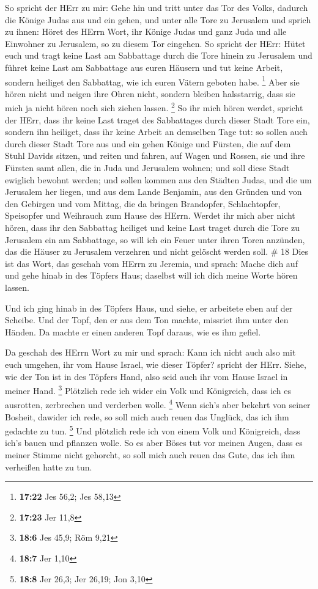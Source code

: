  So spricht der HErr zu mir: Gehe hin und tritt unter das
Tor des Volks, dadurch die Könige Judas aus und ein gehen, und unter
alle Tore zu Jerusalem  und sprich zu ihnen: Höret des
HErrn Wort, ihr Könige Judas und ganz Juda und alle Einwohner zu
Jerusalem, so zu diesem Tor eingehen.  So spricht der HErr:
Hütet euch und tragt keine Last am Sabbattage durch die Tore hinein zu
Jerusalem  und führet keine Last am Sabbattage aus euren
Häusern und tut keine Arbeit, sondern heiliget den Sabbattag, wie ich
euren Vätern geboten habe. \footnote{\textbf{17:22} Jes 56,2; Jes 58,13}
 Aber sie hören nicht und neigen ihre Ohren nicht, sondern
bleiben halsstarrig, dass sie mich ja nicht hören noch sich ziehen
lassen. \footnote{\textbf{17:23} Jer 11,8}  So ihr mich
hören werdet, spricht der HErr, dass ihr keine Last traget des
Sabbattages durch dieser Stadt Tore ein, sondern ihn heiliget, dass ihr
keine Arbeit an demselben Tage tut:  so sollen auch durch
dieser Stadt Tore aus und ein gehen Könige und Fürsten, die auf dem
Stuhl Davids sitzen, und reiten und fahren, auf Wagen und Rossen, sie
und ihre Fürsten samt allen, die in Juda und Jerusalem wohnen; und soll
diese Stadt ewiglich bewohnt werden;  und sollen kommen aus
den Städten Judas, und die um Jerusalem her liegen, und aus dem Lande
Benjamin, aus den Gründen und von den Gebirgen und vom Mittag, die da
bringen Brandopfer, Schlachtopfer, Speisopfer und Weihrauch zum Hause
des HErrn.  Werdet ihr mich aber nicht hören, dass ihr den
Sabbattag heiliget und keine Last traget durch die Tore zu Jerusalem ein
am Sabbattage, so will ich ein Feuer unter ihren Toren anzünden, das die
Häuser zu Jerusalem verzehren und nicht gelöscht werden soll. \# 18
 Dies ist das Wort, das geschah vom HErrn zu Jeremia, und
sprach:  Mache dich auf und gehe hinab in des Töpfers Haus;
daselbst will ich dich meine Worte hören lassen.

 Und ich ging hinab in des Töpfers Haus, und siehe, er
arbeitete eben auf der Scheibe.  Und der Topf, den er aus
dem Ton machte, missriet ihm unter den Händen. Da machte er einen
anderen Topf daraus, wie es ihm gefiel.

 Da geschah des HErrn Wort zu mir und sprach: 
Kann ich nicht auch also mit euch umgehen, ihr vom Hause Israel, wie
dieser Töpfer? spricht der HErr. Siehe, wie der Ton ist in des Töpfers
Hand, also seid auch ihr vom Hause Israel in meiner Hand. \footnote{\textbf{18:6}
  Jes 45,9; Röm 9,21}  Plötzlich rede ich wider ein Volk und
Königreich, dass ich es ausrotten, zerbrechen und verderben wolle.
\footnote{\textbf{18:7} Jer 1,10}  Wenn sich's aber bekehrt
von seiner Bosheit, dawider ich rede, so soll mich auch reuen das
Unglück, das ich ihm gedachte zu tun. \footnote{\textbf{18:8} Jer 26,3;
  Jer 26,19; Jon 3,10}  Und plötzlich rede ich von einem
Volk und Königreich, dass ich's bauen und pflanzen wolle. 
So es aber Böses tut vor meinen Augen, dass es meiner Stimme nicht
gehorcht, so soll mich auch reuen das Gute, das ich ihm verheißen hatte
zu tun.

